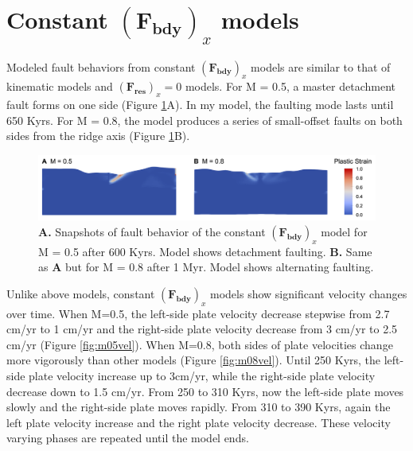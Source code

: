 \documentclass[letterpaper,12pt,notitle]{memphisthesis}                     %
\begin{document}
\section{Constant $(\boldsymbol{F_{bdy}})_x$ models}

Modeled fault behaviors from constant $(\boldsymbol{F_{bdy}})_x$ models are similar to that of kinematic models and  $(\boldsymbol{F_{res}})_x = 0$  models. For M = 0.5, a master detachment fault forms on one side (Figure \ref{fig:fbfault}A). In my model, the  faulting mode lasts until 650 Kyrs. For M = 0.8, the model produces a series of small-offset faults on both sides from the ridge axis (Figure \ref{fig:fbfault}B).

\begin{figure}[!htb]
	\centering
	\includegraphics[width=0.99\linewidth]{./figs/fbfault.png}
	\caption{\textbf{A.} Snapshots of fault behavior of the constant $(\boldsymbol{F_{bdy}})_x$ model for M = 0.5 after 600 Kyrs. Model shows detachment faulting. \textbf{B.} Same as \textbf{A} but for M = 0.8 after 1 Myr. Model shows alternating faulting.}
	\label{fig:fbfault}
\end{figure}

Unlike above models, constant $(\boldsymbol{F_{bdy}})_x$ models show significant velocity changes over time. 
When M=0.5, the left-side plate velocity decrease stepwise from 2.7 cm/yr to 1 cm/yr and the right-side plate velocity decrease from 3 cm/yr to 2.5 cm/yr (Figure \ref{fig:m05vel}).
When M=0.8, both sides of plate velocities change more vigorously than other models (Figure \ref{fig:m08vel}). Until 250 Kyrs, the left-side plate velocity increase up to 3cm/yr, while the right-side plate velocity decrease down to 1.5 cm/yr. From 250 to 310 Kyrs, now the left-side plate moves slowly and the right-side plate moves rapidly. From 310 to 390 Kyrs, again the left plate velocity increase and the right plate velocity decrease. These velocity varying phases are repeated until the model ends.

\end{document}
